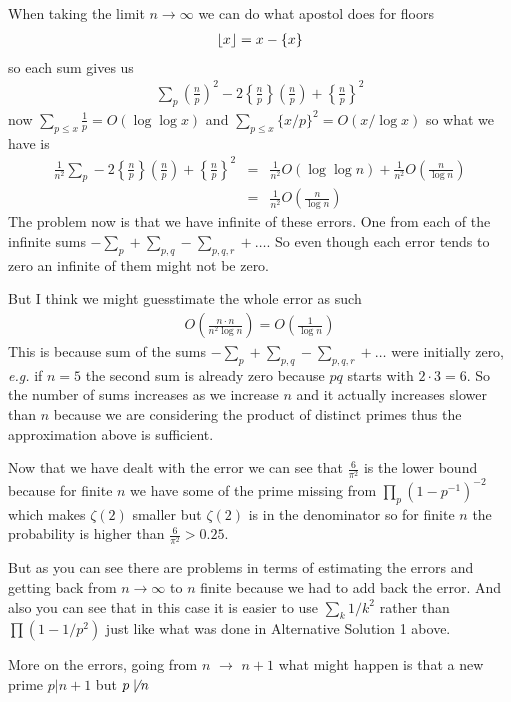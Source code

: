 \documentclass[aps,preprint,preprintnumbers,nofootinbib,showpacs,prd]{revtex4-1}
\newcommand{\eg}{{\it e.g.} }
\newcommand{\nbea}{\begin{eqnarray*}}
\newcommand{\neea}{\end{eqnarray*}}
\DeclarePairedDelimiter{\floor}{\lfloor}{\rfloor}
\begin{document}
\begin{enumerate}
When taking the limit $n \to \infty$ we can do what apostol does for floors
%
\nbea
\floor{x} = x - \{ x \}
\neea
%
so each sum gives us
%
\nbea
\sum_p \left ( \frac{n}{p} \right )^2 - 2 \left \{ \frac{n}{p} \right \} \left ( \frac{n}{p} \right ) + \left \{ \frac{n}{p} \right \}^2
\neea
%
now $\sum_{p \le x} \frac{1}{p} = O(\log\log x)$ and $\sum_{p \le x} \{x/p\}^2 = O(x/\log x)$ so what we have is 
%
\nbea
\frac{1}{n^2} \sum_p - 2 \left \{ \frac{n}{p} \right \} \left ( \frac{n}{p} \right ) + \left \{ \frac{n}{p} \right \}^2 & = &\frac{1}{n^2} O(\log\log n) + \frac{1}{n^2}O\left(\frac{n}{\log n}\right) \\
& = & \frac{1}{n^2} O\left ( \frac{n}{\log n} \right )
\neea
%
The problem now is that we have infinite of these errors. One from each of the infinite sums $-\sum_p + \sum_{p,q} - \sum_{p,q,r} + \dots$. So even though each error tends to zero an infinite of them might not be zero.

But I think we might guesstimate the whole error as such 
%
\nbea
O\left ( \frac{n\cdot n}{n^2 \log n} \right ) = O \left ( \frac{1}{\log n} \right )
\neea
%
This is because sum of the sums $-\sum_p + \sum_{p,q} - \sum_{p,q,r} + \dots$ were initially zero, \eg if $n = 5$ the second sum is already zero because $pq$ starts with $2\cdot3 = 6$. So the number of sums increases as we increase $n$ and it actually increases slower than $n$ because we are considering the product of distinct primes thus the approximation above is sufficient.

Now that we have dealt with the error we can see that $\frac{6}{\pi^2}$ is the lower bound because for finite $n$ we have some of the prime missing from $\prod_p (1 - p^{-1})^{-2}$ which makes $\zeta(2)$ smaller but $\zeta(2)$ is in the denominator so for finite $n$ the probability is higher than $\frac{6}{\pi^2} > 0.25$.

But as you can see there are problems in terms of estimating the errors and getting back from $n \to \infty$ to $n$ finite because we had to add back the error. And also you can see that in this case it is easier to use $\sum_k 1/k^2$ rather than $\prod (1 - 1/p^2)$ just like what was done in Alternative Solution 1 above.

%

\end{enumerate}
%







































More on the errors, going from $n$ $\to$ $n+1$ what might happen is that a new prime $p|n+1$ but $p\not\mid n$
\end{document}
